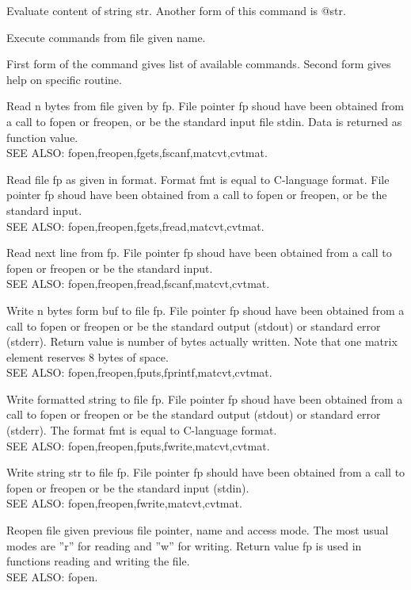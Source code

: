 Evaluate content of string str. Another form of this command is @str. 

Execute commands from file given name. 

First form of the command gives list of available commands. Second form gives help on specific routine. 

Read n bytes from file given by fp. File pointer fp shoud have been obtained from a call to fopen or freopen, or be the standard input file stdin. Data is returned as function value.  \\
SEE ALSO: fopen,freopen,fgets,fscanf,matcvt,cvtmat. 

Read file fp as given in format. Format fmt is equal to C-language format. File pointer fp shoud have been obtained from a call to fopen or freopen, or be the standard input. \\
SEE ALSO: fopen,freopen,fgets,fread,matcvt,cvtmat. 

Read next line from fp. File pointer fp shoud have been obtained from a call to fopen or freopen or be the standard input. \\ 
SEE ALSO: fopen,freopen,fread,fscanf,matcvt,cvtmat. 

Write n bytes form buf to file fp. File pointer fp shoud have been obtained from a call to fopen or freopen or be the standard output (stdout) or standard error (stderr). Return value is number of bytes actually written. 
Note that one matrix element reserves 8 bytes of space. \\
SEE ALSO: fopen,freopen,fputs,fprintf,matcvt,cvtmat. 

Write formatted string to file fp. File pointer fp shoud have been obtained from a call to fopen or freopen or be the standard output (stdout) or standard error (stderr). The format fmt is equal to C-language format. \\
SEE ALSO: fopen,freopen,fputs,fwrite,matcvt,cvtmat. 

Write string str to file fp. File pointer fp should have been obtained from a call to fopen or freopen or be the standard input (stdin). \\SEE ALSO: fopen,freopen,fwrite,matcvt,cvtmat. 

Reopen file given previous file pointer, name and access mode. The most usual modes are ''r'' for reading and ''w'' for writing. Return value fp is used in functions reading and writing the file. \\
SEE ALSO: fopen. 


